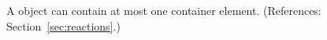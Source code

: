 A \KineticLaw object can contain at most one 
container element.  (References: Section~\ref{sec:reactions}.)
